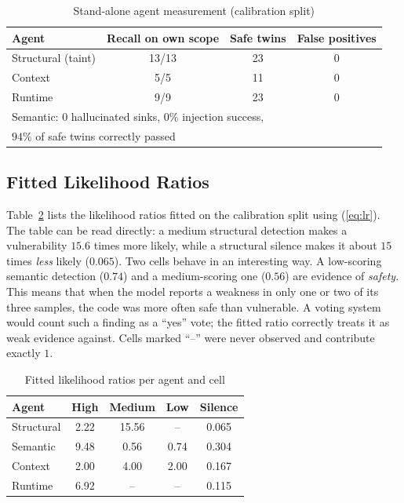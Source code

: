 \documentclass[conference]{IEEEtran}
\begin{document}
\begin{table}[t]
\centering
\caption{Stand-alone agent measurement (calibration split)}
\label{tab:agentperf}
\small
\setlength{\tabcolsep}{3pt}
\begin{tabular}{lccc}
\toprule
Agent & Recall on own scope & Safe twins & False positives \\
\midrule
Structural (taint) & 13/13 & 23 & 0 \\
Context            & 5/5   & 11 & 0 \\
Runtime            & 9/9   & 23 & 0 \\
\midrule
\multicolumn{4}{l}{Semantic: 0 hallucinated sinks, 0\% injection success,}\\
\multicolumn{4}{l}{\quad $94\%$ of safe twins correctly passed}\\
\bottomrule
\end{tabular}
\end{table}

\subsection{Fitted Likelihood Ratios}
Table~\ref{tab:lr} lists the likelihood ratios fitted on the calibration
split using (\ref{eq:lr}). The table can be read directly: a medium
structural detection makes a vulnerability $15.6$ times more likely, while
a structural silence makes it about $15$ times \emph{less} likely
($0.065$). Two cells behave in an interesting way. A low-scoring semantic
detection ($0.74$) and a medium-scoring one ($0.56$) are evidence of
\emph{safety}. This means that when the model reports a weakness in only
one or two of its three samples, the code was more often safe than
vulnerable. A voting system would count such a finding as a ``yes'' vote;
the fitted ratio correctly treats it as weak evidence against. Cells marked
``--'' were never observed and contribute exactly $1$.

\begin{table}[t]
\centering
\caption{Fitted likelihood ratios per agent and cell}
\label{tab:lr}
\small
\setlength{\tabcolsep}{4pt}
\begin{tabular}{lcccc}
\toprule
Agent & High & Medium & Low & Silence \\
\midrule
Structural & 2.22  & 15.56 & --   & 0.065 \\
Semantic   & 9.48  & 0.56  & 0.74 & 0.304 \\
Context    & 2.00  & 4.00  & 2.00 & 0.167 \\
Runtime    & 6.92  & --    & --   & 0.115 \\
\bottomrule
\end{tabular}
\end{table}
\end{document}
